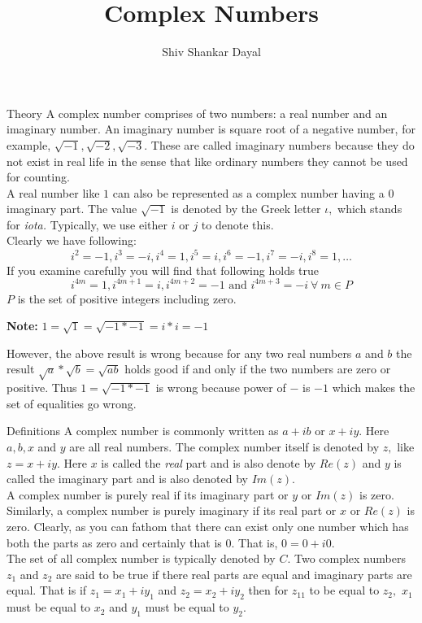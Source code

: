 \documentclass[aspectratio=169,8pt]{beamer}
\title{Complex Numbers}
\author[Shiv Shankar Dayal]{Shiv Shankar Dayal}
\begin{document}
\begin{frame}
       \titlepage
\end{frame}
\begin{frame}{Theory}
  A complex number comprises of two numbers: a real number and an imaginary number. An imaginary number is square root of a
  negative number, for example, $\sqrt{-1}, \sqrt{-2}, \sqrt{-3}.$ These are called imaginary numbers because they do not exist in
  real life in the sense that like ordinary numbers they cannot be used for counting.\\
  \vspace*{0.2cm}
  A real number like $1$ can also be represented as a complex number having a $0$ imaginary part. The value $\sqrt{-1}$ is denoted
  by the Greek letter $\iota,$ which stands for \textit{iota.} Typically, we use either $i$ or $j$ to denote this.\\
  \vspace*{0.2cm}
  Clearly we have following:
  $$i^2 = -1, i^3 = -i, i^4 = 1, i^5 = i, i^6 = -1, i^7 = -i, i^8 = 1, \ldots$$
  If you examine carefully you will find that following holds true
  $$i^{4m} = 1, i^{4m + 1} = i, i^{4m + 2} = -1\text{~and~}i^{4m + 3}= -i~\forall~m\in P$$
  $P$ is the set of positive integers including zero.

  \textbf{Note:} $1 = \sqrt{1} = \sqrt{-1*-1} = i * i = -1$

  However, the above result is wrong because for any two real numbers $a$ and $b$ the result $\sqrt{a}*\sqrt{b} = \sqrt{ab}$ holds
  good if and only if the two numbers are zero or positive. Thus $1 = \sqrt{-1*-1}$ is wrong because power of $-$ is $-1$ which
  makes the set of equalities go wrong.
\end{frame}
\begin{frame}{Definitions}
  A complex number is commonly written as $a + ib$ or $x + iy.$ Here $a, b, x$ and $y$ are all real numbers. The complex number
  itself is denoted by $z,$ like $z = x + iy.$ Here $x$ is called the \textit{real} part and is also denote by $Re(z)$ and $y$ is
  called the imaginary part and is also denoted by $Im(z).$\\
  \vspace*{0.2cm}
  A complex number is purely real if its imaginary part or $y$ or $Im(z)$ is zero. Similarly, a complex number is purely imaginary
  if its real part or $x$ or $Re(z)$ is zero. Clearly, as you can fathom that there can exist only one number which has both the
  parts as zero and certainly that is $0.$ That is, $0=0+i0.$\\
  \vspace*{0.2cm}
  The set of all complex number is typically denoted by $C$. Two complex numbers $z_1$ and $z_2$ are said to be true if there real
  parts are equal and imaginary parts are equal. That is if $z_1 = x_1 + iy_1$ and $z_2 = x_2 + iy_2$ then for $z_11$ to be equal
  to $z_2,$ $x_1$ must be equal to $x_2$ and $y_1$ must be equal to $y_2.$
\end{frame}
\end{document}
